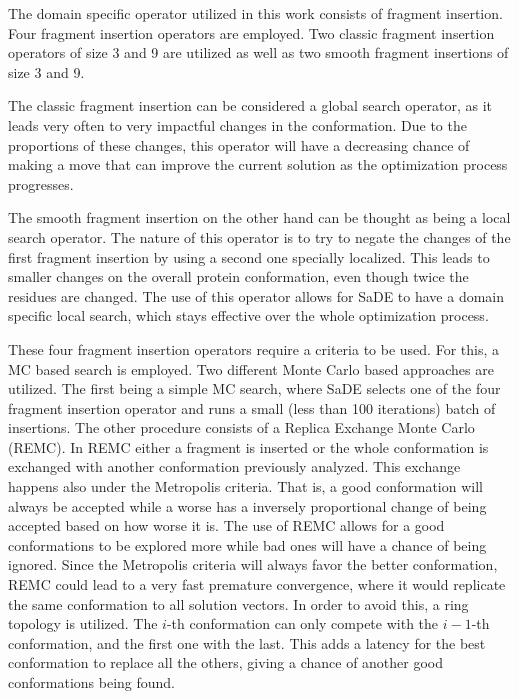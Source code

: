 The domain specific operator utilized in this work consists of
fragment insertion. Four fragment insertion operators are employed.
Two classic fragment insertion operators of size 3 and 9 are utilized
as well as two smooth fragment insertions of size 3 and 9.

The classic fragment insertion can be considered a global search
operator, as it leads very often to very impactful changes
in the conformation. Due to the proportions of these changes,
this operator will have a decreasing chance of making a move
that can improve the current solution as the optimization process
progresses.

The smooth fragment insertion on the other hand can be thought as
being a local search operator. The nature of this operator
is to try to negate the changes of the first fragment insertion by using
a second one specially localized. This leads to smaller changes on the
overall protein conformation, even though twice the residues are changed.
The use of this operator allows for \ac{SaDE} to have a domain specific local
search, which stays effective over the whole optimization process.

These four fragment insertion operators require a criteria to be used. For this,
a \ac{MC} based search is employed. Two different Monte Carlo based approaches
are utilized. The first being a simple \ac{MC} search, where \ac{SaDE} selects one of
the four fragment insertion operator and runs a small (less than 100 iterations)
batch of insertions. The other procedure consists
of a Replica Exchange Monte Carlo (REMC). In \ac{REMC} either a fragment is inserted or the whole conformation is exchanged with another conformation previously analyzed. This exchange happens also under the Metropolis
criteria. That is, a good conformation will always be accepted while a worse has
a inversely proportional change of being accepted based on how worse it is.
The use of \ac{REMC} allows for a good conformations to be explored more while
bad ones will have a chance of being ignored. Since the Metropolis criteria
will always favor the better conformation, \ac{REMC} could lead to a very fast premature
convergence, where it would replicate the same conformation to all solution vectors.
In order to avoid this, a ring topology is utilized. The $i$-th conformation can only
compete with the $i-1$-th conformation, and the first one with the last. This
adds a latency for the best conformation to replace all the others, giving a chance
of another good conformations being found.

